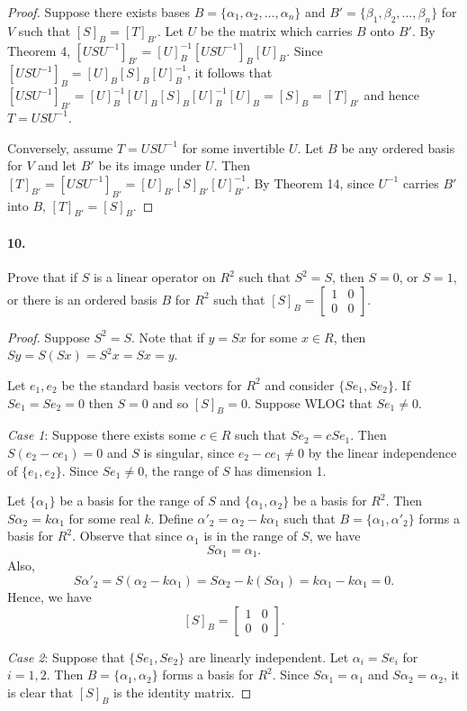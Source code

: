 \documentclass{article}
\begin{document}
\begin{proof}
  Suppose there exists bases $B = \{\alpha_1, \alpha_2, \ldots, \alpha_n\}$ and
  $B' = \{\beta_1, \beta_2, \ldots, \beta_n\}$ for $V$ such that $[S]_B =
  [T]_{B'}$. Let $U$ be the matrix which carries $B$ onto $B'$. By Theorem 4,
  $[USU^{-1}]_{B'} = [U]_B^{-1}[USU^{-1}]_B[U]_B$. Since $[USU^{-1}]_B
  = [U]_B[S]_B[U]_B^{-1}$, it follows that $[USU^{-1}]_{B'} = [U]_B^{-1}[U]_B
  [S]_B[U]_B^{-1}[U]_B = [S]_B = [T]_{B'}$ and hence $T = USU^{-1}$.

  Conversely, assume $T = USU^{-1}$ for some invertible $U$. Let $B$ be any
  ordered basis for $V$ and let $B'$ be its image under $U$. Then $[T]_{B'} =
  [USU^{-1}]_{B'} = [U]_{B'}[S]_{B'}[U]_{B'}^{-1}$. By Theorem 14, since
  $U^{-1}$ carries $B'$ into $B$, $[T]_{B'} = [S]_B$.
\end{proof}

\paragraph{10.} Prove that if $S$ is a linear operator on $R^2$ such that $S^2 =
S$, then $S = 0$, or $S = 1$, or there is an ordered basis $B$ for $R^2$ such
that $[S]_B = \begin{bmatrix}
  1 & 0 \\ 0 & 0
\end{bmatrix}$.

\begin{proof}
  Suppose $S^2 = S$. Note that if $y = Sx$ for some $x \in R$, then $Sy = S(Sx)
  = S^2x = Sx = y$.

  Let $e_1, e_2$ be the standard basis vectors for $R^2$ and consider $\{Se_1,
  Se_2\}$. If $Se_1 = Se_2 = 0$ then $S = 0$ and so $[S]_B = 0$. Suppose WLOG
  that $Se_1 \neq 0$.

  \textit{Case 1}: Suppose there exists some $c \in R$ such that $Se_2 = cSe_1$.
  Then $S(e_2 - ce_1) = 0$ and $S$ is singular, since $e_2 - ce_1 \neq 0$ by the
  linear independence of $\{e_1, e_2\}$. Since $Se_1 \neq 0$, the range of $S$
  has dimension 1.

  Let $\{\alpha_1\}$ be a basis for the range of $S$ and $\{\alpha_1,
  \alpha_2\}$ be a basis for $R^2$. Then $S\alpha_2 = k\alpha_1$ for some real
  $k$. Define $\alpha'_2 = \alpha_2 - k\alpha_1$ such that $B = \{\alpha_1,
  \alpha'_2\}$ forms a basis for $R^2$. Observe that since $\alpha_1$ is in the
  range of $S$, we have \[
    S\alpha_1 = \alpha_1.
  \] Also, \[
    S\alpha'_2 = S(\alpha_2 - k\alpha_1) = S\alpha_2 - k(S\alpha_1) = k\alpha_1
    - k\alpha_1 = 0.
  \] Hence, we have \[
    [S]_B = \begin{bmatrix}
      1 & 0 \\ 0 & 0
    \end{bmatrix}.
  \]

  \textit{Case 2}: Suppose that $\{Se_1, Se_2\}$ are linearly independent. Let
  $\alpha_i = Se_i$ for $i = 1, 2$. Then $B = \{\alpha_1, \alpha_2\}$ forms a
  basis for $R^2$. Since $S\alpha_1 = \alpha_1$ and $S\alpha_2 = \alpha_2$, it
  is clear that $[S]_B$ is the identity matrix.
\end{proof}
\end{document}
